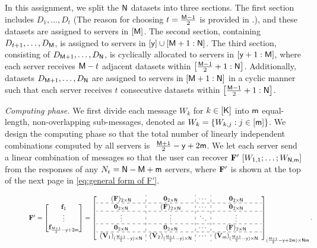 \documentclass[conference,letterpaper]{IEEEtran}
\begin{document}
In this assignment, we split the ${\sf N}$ datasets into three sections. The first section includes $D_1, \ldots, D_t$ (The reason for choosing $t = \frac{{\sf M} - 1}{2}$ is provided in \cite{wan2022secure}.), and these datasets are assigned to servers in $[{\sf M}]$. The second section, containing $D_{t+1}, \ldots, D_{{\sf M}}$, is assigned to servers in $[{\sf y}] \cup [{\sf M}+1 : {\sf N}]$. The third section, consisting of $D_{{\sf M}+1}, \ldots, D_{{\sf N}}$, is cyclically allocated to servers in $[{\sf y}+1 : {\sf M}]$, where each server receives ${\sf M} - t$ adjacent datasets within $\left[{\frac{{\sf M} - 1}{2} + 1} : {\sf N} \right]$. Additionally, datasets $D_{{\sf M}+1}, \ldots, D_{{\sf N}}$ are assigned to servers in $[{\sf M}+1 : {\sf N}]$ in a cyclic manner such that each server receives $t$ consecutive datasets within $\left[{\frac{{\sf M} - 1}{2} + 1} : {\sf N} \right]$.

  {\it Computing phase.}
  We first divide each message $W_k$ for $k \in [{\sf K}]$ into ${\sf m}$ equal-length, non-overlapping sub-messages, denoted as $W_k = \{W_{k,j} : j \in [{\sf m}]\}$.
We design the computing phase so that the total number of linearly independent combinations computed by all servers is $\ \frac {{\sf M} + 1}{2} - {\sf y} + 2{\sf m}$. We let each server send a linear combination of messages so that the user can recover ${\bf F}' \ [W_{1,1}; \ldots; W_{{\sf N},{\sf m}}]$ from the responses of any $N_{\rm r} = {\sf N} - {\sf M} +{\sf m}$ servers, where \( {\bf F}' \) is shown at the top of the next page in \eqref{eq:general form of F'}.
\begin{figure}
\begin{equation}
\scalebox{0.8}{$
{\bf F}' = \begin{bmatrix}
 \fv_1 \\
 \vdots \\
 \fv_{\frac{\Msf+1}{2}-\ysf+2\msf} 
 \end{bmatrix}
 =
\left[
\begin{array}{c:c:c:c}
 ({\bf F})_{2 \times \Nsf}  & {\bf 0}_{2 \times \Nsf}  & \cdots & {\bf 0}_{2 \times \Nsf}   \\ \hdashline
{\bf 0}_{2 \times \Nsf} &  ({\bf F})_{2 \times \Nsf}   & \cdots & {\bf 0}_{2 \times \Nsf}   \\ \hdashline 
 \vdots   & \vdots  &  \ddots & \vdots \\ \hdashline
 {\bf 0}_{2 \times \Nsf} &   {\bf 0}_{2 \times \Nsf}    & \cdots &  ({\bf F})_{2 \times \Nsf} \\ \hdashline
 ({\bf V}_{1})_{ (\frac{\Msf + 1}{2} - \ysf) \times \Nsf}  &  ({\bf V}_{2})_{ (\frac{\Msf + 1}{2} - \ysf) \times \Nsf}  &   \cdots   &   ({\bf V}_{\msf})_{ (\frac{\Msf + 1}{2} - \ysf) \times \Nsf} 
 \end{array}
\right]_{(\frac{\Msf + 1}{2} - \ysf + 2\msf) \times \Nsf\msf}.
$}
\label{eq:general form of F'}
\end{equation}

\end{figure}
\end{document}
